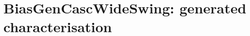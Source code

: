 \documentclass[11pt]{article}
\begin{document}
\section*{BiasGenCascWideSwing: generated characterisation}

\end{document}

